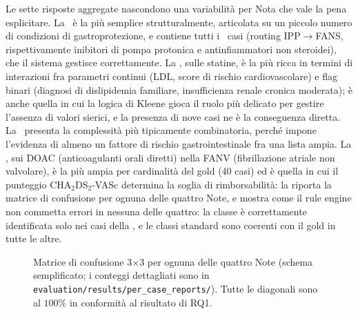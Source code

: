 Le sette risposte aggregate nascondono una variabilità per Nota che vale la pena esplicitare. La \notezero\ è la più semplice strutturalmente, articolata su un piccolo numero di condizioni di gastroprotezione, e contiene tutti i \goldRouted\ casi  (routing IPP$\to$FANS, rispettivamente inibitori di pompa protonica e antinfiammatori non steroidei), che il sistema gestisce correttamente. La \notetredici, sulle statine, è la più ricca in termini di interazioni fra parametri continui (LDL, score di rischio cardiovascolare) e flag binari (diagnosi di dislipidemia familiare, insufficienza renale cronica moderata); è anche quella in cui la logica di Kleene gioca il ruolo più delicato per gestire l'assenza di valori sierici, e la presenza di nove casi  ne è la conseguenza diretta. La \notesessanta\ presenta la complessità più tipicamente combinatoria, perché impone l'evidenza di almeno un fattore di rischio gastrointestinale fra una lista ampia. La \notenova, sui DOAC (anticoagulanti orali diretti) nella FANV (fibrillazione atriale non valvolare), è la più ampia per cardinalità del gold ($40$ casi) ed è quella in cui il punteggio CHA$_2$DS$_2$-VASc determina la soglia di rimborsabilità: la  riporta la matrice di confusione per ognuna delle quattro Note, e mostra come il rule engine non commetta errori in nessuna delle quattro: la classe  è correttamente identificata solo nei casi della \notezero, e le classi standard sono coerenti con il gold in tutte le altre.

\begin{figure}[t]
  \centering
  \caption{Matrice di confusione 3$\times$3 per ognuna delle quattro Note (schema semplificato; i conteggi dettagliati sono in \texttt{evaluation/results/per\_case\_reports/}). Tutte le diagonali sono al $100\%$ in conformità al risultato di RQ1.}
  \label{fig:cm-per-nota}
\end{figure}

